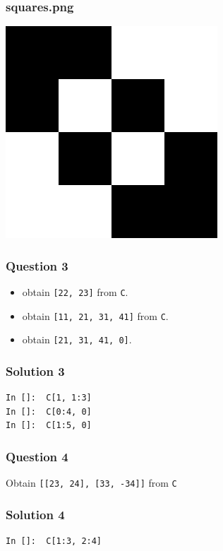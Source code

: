 \documentclass[presentation]{beamer}
\begin{document}
\begin{frame}
\frametitle{squares.png}
\label{sec-7}

    \begin{center}
      \includegraphics[scale=0.6]{squares}    
    \end{center}
\end{frame}
\begin{frame}
\frametitle{Question 3}
\label{sec-8}

\begin{itemize}
\item obtain \texttt{[22, 23]} from \texttt{C}.
\item obtain \texttt{[11, 21, 31, 41]} from \texttt{C}.
\item obtain \texttt{[21, 31, 41, 0]}.
\end{itemize}
\end{frame}
\begin{frame}[fragile]
\frametitle{Solution 3}
\label{sec-9}

\lstset{language=Python}
\begin{lstlisting}
In []:  C[1, 1:3]
In []:  C[0:4, 0]
In []:  C[1:5, 0]
\end{lstlisting}
\end{frame}
\begin{frame}
\frametitle{Question 4}
\label{sec-10}

  Obtain \texttt{[[23, 24], [33, -34]]} from \texttt{C}
\end{frame}
\begin{frame}[fragile]
\frametitle{Solution 4}
\label{sec-11}

\lstset{language=Python}
\begin{lstlisting}
In []:  C[1:3, 2:4]
\end{lstlisting}
\end{frame}
\end{document}
